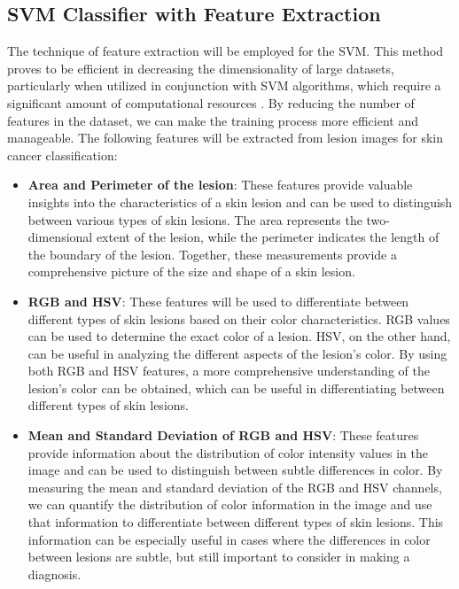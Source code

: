 \documentclass[12pt]{diazessay}
\begin{document}
    \subsection{SVM Classifier with Feature Extraction}
     \-\hspace{0.7cm} The technique of feature extraction will be employed for the SVM. This method proves to be efficient in decreasing the dimensionality of large datasets, particularly when utilized in conjunction with SVM algorithms, which require a significant amount of computational resources \cite{hira2015review}. By reducing the number of features in the dataset, we can make the training process more efficient and manageable.
    The following features will be extracted from lesion images for skin cancer classification:
    \begin{itemize}
    \item \textbf{Area and Perimeter of the lesion}: These features provide valuable insights into the characteristics of a skin lesion and can be used to distinguish between various types of skin lesions. The area represents the two-dimensional extent of the lesion, while the perimeter indicates the length of the boundary of the lesion. Together, these measurements provide a comprehensive picture of the size and shape of a skin lesion.
    \item \textbf{RGB and HSV}: These features will be used to differentiate between different types of skin lesions based on their color characteristics. RGB values can be used to determine the exact color of a lesion. HSV, on the other hand, can be useful in analyzing the different aspects of the lesion's color. By using both RGB and HSV features, a more comprehensive understanding of the lesion's color can be obtained, which can be useful in differentiating between different types of skin lesions.
    \item \textbf{Mean and Standard Deviation of RGB and HSV}: These features provide information about the distribution of color intensity values in the image and can be used to distinguish between subtle differences in color. By measuring the mean and standard deviation of the RGB and HSV channels, we can quantify the distribution of color information in the image and use that information to differentiate between different types of skin lesions. This information can be especially useful in cases where the differences in color between lesions are subtle, but still important to consider in making a diagnosis.
    \end{itemize}
    
\end{document}
